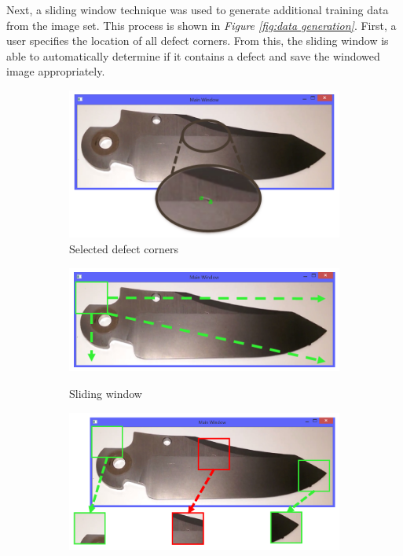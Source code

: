 \documentclass[letterpaper, 10 pt, conference]{ieeeconf}  %
\begin{document}
Next, a sliding window technique was used to generate additional training data from the image set. This process is shown in \textit{Figure \ref{fig:data generation}}. First, a user specifies the location of all defect corners. From this, the sliding window is able to automatically determine if it contains a defect and save the windowed image appropriately.

\begin{figure}
    \centering
    \begin{subfigure}[b]{.32\textwidth}
        \centering
        \includegraphics[width=.9\textwidth]{defect_location.png}
        \caption{Selected defect corners}
        \vspace*{2mm}
        \label{fig:defect corners}
    \end{subfigure}
    \hfill
    \begin{subfigure}[b]{.32\textwidth}
        \centering
        \raisebox{8.2mm}
        {\includegraphics[width=.9\textwidth]{defect_sliding_window.png}}
        \caption{Sliding window}
        \vspace*{2mm}
        \label{fig:sliding window}
    \end{subfigure}
    \hfill
    \begin{subfigure}[b]{.32\textwidth}
        \centering
        \raisebox{1.7mm}
        {\includegraphics[width=.9\textwidth]{defect_windows.png}}

\end{subfigure}
\end{figure}
\end{document}
